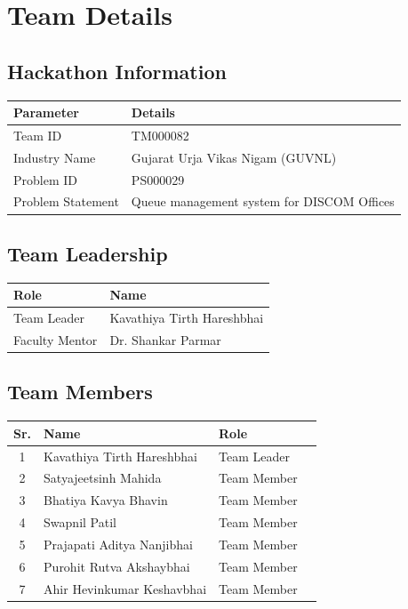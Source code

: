 \documentclass[12pt,a4paper]{report}
\begin{document}
\newpage
\tableofcontents

\newpage
\chapter*{Team Details}

\section*{Hackathon Information}
\begin{tabular}{p{5cm}p{10cm}}
    \toprule
    \textbf{Parameter} & \textbf{Details} \\
    \midrule
    Team ID & TM000082 \\
    Industry Name & Gujarat Urja Vikas Nigam (GUVNL) \\
    Problem ID & PS000029 \\
    Problem Statement & Queue management system for DISCOM Offices \\
    \bottomrule
\end{tabular}

\vspace{1cm}

\section*{Team Leadership}
\begin{tabular}{p{5cm}p{10cm}}
    \toprule
    \textbf{Role} & \textbf{Name} \\
    \midrule
    Team Leader & Kavathiya Tirth Hareshbhai \\
    Faculty Mentor & Dr. Shankar Parmar \\
    \bottomrule
\end{tabular}

\vspace{1cm}

\section*{Team Members}
\begin{center}
\begin{tabular}{clp{6cm}l}
    \toprule
    \textbf{Sr.} & \textbf{Name} & \textbf{Role} \\
    \midrule
    1 & Kavathiya Tirth Hareshbhai & Team Leader \\
    2 & Satyajeetsinh Mahida & Team Member \\
    3 & Bhatiya Kavya Bhavin & Team Member \\
    4 & Swapnil Patil & Team Member \\
    5 & Prajapati Aditya Nanjibhai & Team Member \\
    6 & Purohit Rutva Akshaybhai & Team Member \\
    7 & Ahir Hevinkumar Keshavbhai & Team Member \\
    \bottomrule
\end{tabular}
\end{center}
\end{document}
